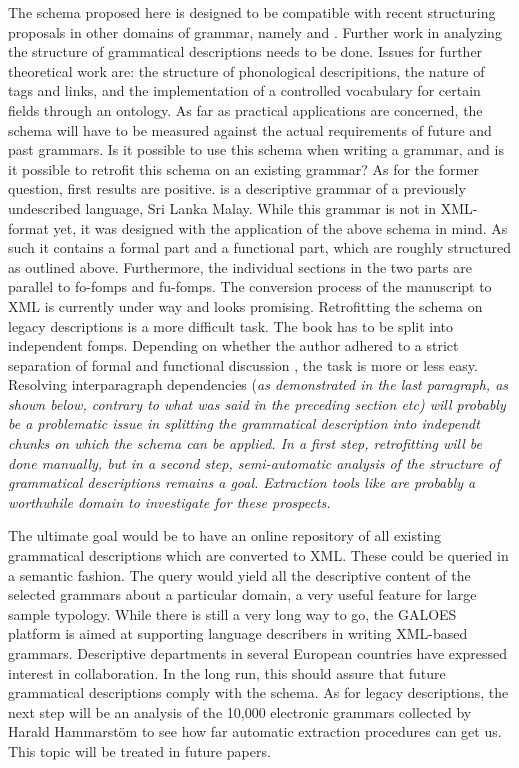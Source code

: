 \documentclass[a4paper,12pt]{article}
\begin{document}
The schema proposed here is designed to be compatible with recent structuring proposals in other domains of grammar, namely \citet{BowEtAl2003} and \citet{Good2004}. Further work in analyzing the structure of grammatical descriptions needs to be done. Issues for further theoretical work are: the structure of phonological descripitions, the nature of tags and links, and the implementation of a controlled vocabulary for certain fields through an ontology. As far as practical applications are concerned, the schema will have to be measured against the actual requirements of future and past grammars. Is it possible to use this schema when writing a grammar, and is it possible to retrofit this schema on an existing grammar? As for the former question, first results are positive. \citet{Nordhoff2009phd} is a descriptive grammar of a previously undescribed language, Sri Lanka Malay. While this grammar is not in XML-format yet, it was designed with the application of the above schema in mind. As such it contains a formal part and a functional part, which are roughly structured as outlined above. Furthermore, the individual sections in the two parts are parallel to fo-fomps and fu-fomps. The conversion process of the manuscript to XML is currently under way and looks promising. Retrofitting the schema on legacy descriptions is a more difficult task. The book has to be split into independent fomps. Depending on whether the author adhered to a strict separation of formal and functional discussion \citep[e.g.][]{Seiler1985}, the task is more or less easy. Resolving interparagraph dependencies (\em as demonstrated in the last paragraph, as shown below, contrary to what was said in the preceding section \em etc) will probably be a problematic issue in splitting the grammatical description into independt chunks on which the schema can be applied. In a first step, retrofitting will be done manually, but in a second step, semi-automatic analysis of the structure of grammatical descriptions remains a goal. Extraction tools like \citet{Lewis2006} are probably a worthwhile domain to investigate for these prospects.

The ultimate goal would be to have an online repository of all existing grammatical descriptions which are converted to XML. These could be queried in a semantic fashion. The query would yield all the descriptive content of the selected grammars about a particular domain, a very useful feature for large sample typology. While there is still a very long way to go, the GALOES platform \citep{Nordhoff2007alt,Nordhoff2007dobes,Nordhoff2007mpi} is aimed at supporting language describers in writing XML-based grammars. Descriptive departments in several European countries have expressed interest in collaboration. In the long run, this should assure that future grammatical descriptions comply with the schema. As for legacy descriptions, the next step will be an analysis of the 10,000 electronic grammars collected by Harald Hammarstöm to see how far automatic extraction procedures can get us. This topic will be treated in future papers.  
\end{document}
